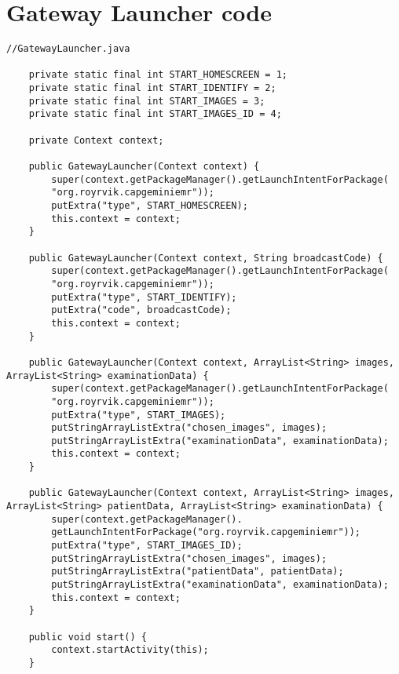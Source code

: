 \section{Gateway Launcher code}
\label{gatewaylauncher}
\lstset{language=Java} 
\begin{lstlisting}[caption={GatewayLauncher.java}, label={lst:gatewaylauncher}]
//GatewayLauncher.java

    private static final int START_HOMESCREEN = 1;
    private static final int START_IDENTIFY = 2;
    private static final int START_IMAGES = 3;
    private static final int START_IMAGES_ID = 4;

    private Context context;

    public GatewayLauncher(Context context) {
        super(context.getPackageManager().getLaunchIntentForPackage(
        "org.royrvik.capgeminiemr"));
        putExtra("type", START_HOMESCREEN);
        this.context = context;
    }

    public GatewayLauncher(Context context, String broadcastCode) {
        super(context.getPackageManager().getLaunchIntentForPackage(
        "org.royrvik.capgeminiemr"));
        putExtra("type", START_IDENTIFY);
        putExtra("code", broadcastCode);
        this.context = context;
    }
    
    public GatewayLauncher(Context context, ArrayList<String> images, ArrayList<String> examinationData) {
        super(context.getPackageManager().getLaunchIntentForPackage(
        "org.royrvik.capgeminiemr"));
        putExtra("type", START_IMAGES);
        putStringArrayListExtra("chosen_images", images);
        putStringArrayListExtra("examinationData", examinationData);
        this.context = context;
    }
    
    public GatewayLauncher(Context context, ArrayList<String> images, ArrayList<String> patientData, ArrayList<String> examinationData) {
        super(context.getPackageManager().
        getLaunchIntentForPackage("org.royrvik.capgeminiemr"));
        putExtra("type", START_IMAGES_ID);
        putStringArrayListExtra("chosen_images", images);
        putStringArrayListExtra("patientData", patientData);
        putStringArrayListExtra("examinationData", examinationData);
        this.context = context;
    }
    
    public void start() {
        context.startActivity(this);
    }
\end{lstlisting}